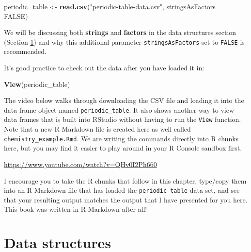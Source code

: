 \documentclass[]{tufte-book}
\newenvironment{Shaded}{\begin{snugshade}}{\end{snugshade}}
\newcommand{\AttributeTok}[1]{\textcolor[rgb]{0.13,0.29,0.53}{#1}}
\newcommand{\ConstantTok}[1]{\textcolor[rgb]{0.56,0.35,0.01}{#1}}
\newcommand{\FunctionTok}[1]{\textcolor[rgb]{0.13,0.29,0.53}{\textbf{#1}}}
\newcommand{\NormalTok}[1]{#1}
\newcommand{\OtherTok}[1]{\textcolor[rgb]{0.56,0.35,0.01}{#1}}
\newcommand{\StringTok}[1]{\textcolor[rgb]{0.31,0.60,0.02}{#1}}
\begin{document}
\begin{Shaded}
\begin{Highlighting}[]
\NormalTok{periodic\_table }\OtherTok{\textless{}{-}} \FunctionTok{read.csv}\NormalTok{(}\StringTok{"periodic{-}table{-}data.csv"}\NormalTok{,}
              \AttributeTok{stringsAsFactors =} \ConstantTok{FALSE}\NormalTok{)}
\end{Highlighting}
\end{Shaded}

We will be discussing both \textbf{strings} and \textbf{factors} in the data structures section (Section \ref{data-structures}) and why this additional parameter \texttt{stringsAsFactors} set to \texttt{FALSE} is recommended.

It's good practice to check out the data after you have loaded it in:

\begin{Shaded}
\begin{Highlighting}[]
\FunctionTok{View}\NormalTok{(periodic\_table)}
\end{Highlighting}
\end{Shaded}

The video below walks through downloading the CSV file and loading it into the data frame object named \texttt{periodic\_table}. It also shows another way to view data frames that is built into RStudio without having to run the \texttt{View} function. Note that a new R Markdown file is created here as well called \texttt{chemistry\_example.Rmd}. We are writing the commands directly into R chunks here, but you may find it easier to play around in your R Console sandbox first.

\vspace{0.1in}\begin{center}\footnotesize{\url{https://www.youtube.com/watch?v=QHv0I2Ph660}}\end{center}\vspace{0.1in}

I encourage you to take the R chunks that follow in this chapter, type/copy them into an R Markdown file that has loaded the \texttt{periodic\_table} data set, and see that your resulting output matches the output that I have presented for you here. This book was written in R Markdown after all!

\section{Data structures}\label{data-structures}
\end{document}
